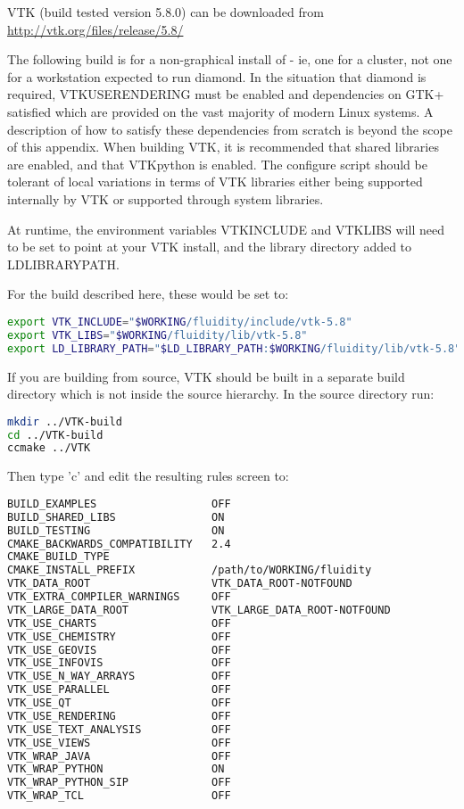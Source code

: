 VTK (build tested version 5.8.0) can be downloaded from
\url{http://vtk.org/files/release/5.8/}

The following build is for a non-graphical install of \fluidity - ie, one for a
cluster, not one for a workstation expected to run diamond. In the situation
that diamond is required, VTK{\textunderscore}USE{\textunderscore}RENDERING
must be enabled and dependencies on GTK+ satisfied which are provided on the
vast majority of modern Linux systems. A description of how to satisfy these
dependencies from scratch is beyond the scope of this appendix. When building
VTK, it is recommended that shared libraries are enabled, and that VTKpython is
enabled. The \fluidity configure script should be tolerant of local variations
in terms of VTK libraries either being supported internally by VTK or supported
through system libraries.

At runtime, the environment variables VTK{\textunderscore}INCLUDE and
VTK{\textunderscore}LIBS will need to be set to point at your VTK install, and
the library directory added to LD{\textunderscore}LIBRARY{\textunderscore}PATH.

For the build described here, these would be set to:

\begin{lstlisting}[language=bash]
export VTK_INCLUDE="$WORKING/fluidity/include/vtk-5.8"
export VTK_LIBS="$WORKING/fluidity/lib/vtk-5.8"
export LD_LIBRARY_PATH="$LD_LIBRARY_PATH:$WORKING/fluidity/lib/vtk-5.8"
\end{lstlisting}

If you are building from source, VTK should be built in a separate build
directory which is not inside the source hierarchy. In the source directory
run:

\begin{lstlisting}[language=bash]
mkdir ../VTK-build
cd ../VTK-build
ccmake ../VTK
\end{lstlisting}

Then type 'c' and edit the resulting rules screen to:

\begin{lstlisting}[language=bash]
BUILD_EXAMPLES                  OFF
BUILD_SHARED_LIBS               ON
BUILD_TESTING                   ON
CMAKE_BACKWARDS_COMPATIBILITY   2.4
CMAKE_BUILD_TYPE
CMAKE_INSTALL_PREFIX            /path/to/WORKING/fluidity
VTK_DATA_ROOT                   VTK_DATA_ROOT-NOTFOUND
VTK_EXTRA_COMPILER_WARNINGS     OFF
VTK_LARGE_DATA_ROOT             VTK_LARGE_DATA_ROOT-NOTFOUND
VTK_USE_CHARTS                  OFF
VTK_USE_CHEMISTRY               OFF
VTK_USE_GEOVIS                  OFF
VTK_USE_INFOVIS                 OFF
VTK_USE_N_WAY_ARRAYS            OFF
VTK_USE_PARALLEL                OFF
VTK_USE_QT                      OFF 
VTK_USE_RENDERING               OFF
VTK_USE_TEXT_ANALYSIS           OFF
VTK_USE_VIEWS                   OFF
VTK_WRAP_JAVA                   OFF
VTK_WRAP_PYTHON                 ON
VTK_WRAP_PYTHON_SIP             OFF
VTK_WRAP_TCL                    OFF 
\end{lstlisting}

